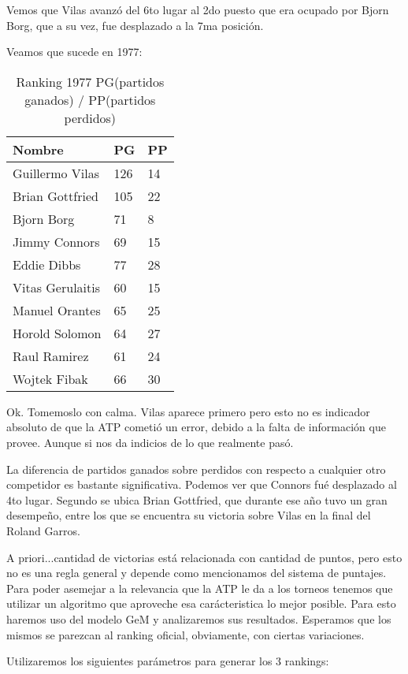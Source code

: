 Vemos que Vilas avanzó del 6to lugar al 2do puesto que era ocupado por Bjorn Borg, que a su vez, fue desplazado a la 7ma posición.

Veamos que sucede en 1977:

\begin{table}[H]
\label{my-label}
\begin{tabular}{lll}
\hline
Nombre  & PG & PP \\ \hline
Guillermo Vilas & 126 & 14 \\
Brian Gottfried & 105 & 22 \\
Bjorn Borg & 71 & 8 \\
Jimmy Connors & 69 & 15 \\
Eddie Dibbs & 77 & 28 \\
Vitas Gerulaitis & 60 & 15 \\
Manuel Orantes & 65 & 25 \\
Horold Solomon & 64 & 27 \\
Raul Ramirez & 61 & 24 \\
Wojtek Fibak & 66 & 30 \\ \hline 
\end{tabular}
\centering
\caption{Ranking 1977 PG(partidos ganados) / PP(partidos perdidos)}
\end{table}

Ok. Tomemoslo con calma. Vilas aparece primero pero esto no es indicador absoluto de que la ATP cometió un error, debido a la falta de información que provee. Aunque si nos da indicios de lo que realmente pasó.

La diferencia de partidos ganados sobre perdidos con respecto a cualquier otro competidor es bastante significativa. Podemos ver que Connors fué desplazado al 4to lugar. Segundo se ubica Brian Gottfried, que durante ese año tuvo un gran desempeño, entre los que se encuentra su victoria sobre Vilas en la final del Roland Garros. 

A priori...cantidad de victorias está relacionada con cantidad de puntos, pero esto no es una regla general y depende como mencionamos del sistema de puntajes. Para poder asemejar a la relevancia que la ATP le da a los torneos tenemos que utilizar un algoritmo que aproveche esa carácteristica lo mejor posible. Para esto haremos uso del modelo GeM y analizaremos sus resultados. Esperamos que los mismos se parezcan al ranking oficial, obviamente, con ciertas variaciones.

Utilizaremos los siguientes parámetros para generar los 3 rankings:

